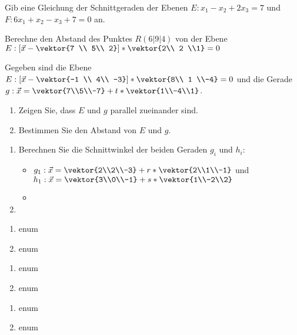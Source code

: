 Gib eine Gleichung der Schnittgeraden der Ebenen $E: x_1-x_2+2x_3=7$ und $F:6x_1+x_2-x_3+7=0$ an.

Berechne den Abstand des Punktes $R(6|9|4)$ von der Ebene $E: \left[ \vec x -  \vektor{7 \\ 5\\ 2}\right]*\vektor{2\\ 2 \\1}=0$

Gegeben sind die Ebene \\$E: \left[ \vec x -  \vektor{-1 \\ 4\\ -3}\right]*\vektor{8\\ 1 \\-4}=0$ und die Gerade $g: \vec x=\vektor{7\\5\\-7}+t*\vektor{1\\-4\\1}$.
\begin{enumerate}
	\item Zeigen Sie, dass $E$ und $g$ parallel zueinander sind.
	\item Bestimmen Sie den Abstand von $E$ und $g$.
\end{enumerate}

\begin{enumerate}
	\item Berechnen Sie die Schnittwinkel der beiden Geraden $g_i$ und $h_i$:
	\begin{itemize}
		\item $g_1: \vec x = \vektor{2\\2\\-3} + r*\vektor{2\\1\\-1}$ und $h_1: \vec x = \vektor{3\\0\\-1} + s* \vektor{1\\-2\\2}$
		\item
	\end{itemize}
	\item
\end{enumerate}

\begin{enumerate}
	\item enum
	\item	enum
\end{enumerate}

\begin{enumerate}
	\item enum
	\item	enum
\end{enumerate}


\begin{enumerate}
	\item enum
	\item	enum
\end{enumerate}



